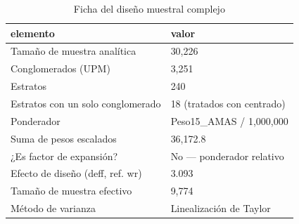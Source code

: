 \begin{table}[htbp]
\caption{Ficha del diseño muestral complejo}
\label{tab:tabla_06_ficha_diseno_muestral}
\begin{tabular}{ll}
\toprule
elemento & valor \\
\midrule
Tamaño de muestra analítica & 30,226 \\
Conglomerados (UPM) & 3,251 \\
Estratos & 240 \\
Estratos con un solo conglomerado & 18 (tratados con centrado) \\
Ponderador & Peso15\_AMAS / 1,000,000 \\
Suma de pesos escalados & 36,172.8 \\
¿Es factor de expansión? & No — ponderador relativo \\
Efecto de diseño (deff, ref. wr) & 3.093 \\
Tamaño de muestra efectivo & 9,774 \\
Método de varianza & Linealización de Taylor \\
\bottomrule
\end{tabular}
\end{table}
